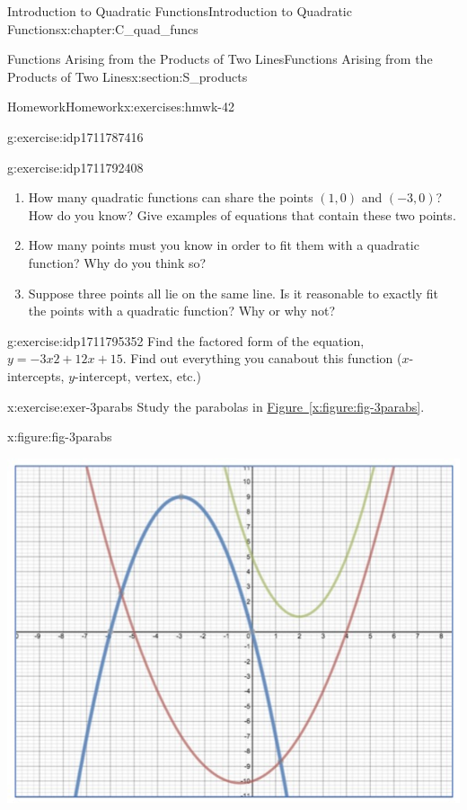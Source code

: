 \documentclass[oneside,10pt,]{book}
\newcommand{\xreffont}{\relax}
\numberwithin{equation}{chapter}
\begin{document}
\begin{chapterptx}{Introduction to Quadratic Functions}{}{Introduction to Quadratic Functions}{}{}{x:chapter:C_quad_funcs}
\begin{sectionptx}{Functions Arising from the Products of Two Lines}{}{Functions Arising from the Products of Two Lines}{}{}{x:section:S_products}
\begin{exercises-subsection}{Homework}{}{Homework}{}{}{x:exercises:hmwk-42}
\begin{divisionexercise}{5}{}{}{g:exercise:idp1711787416}
\begin{enumerate}[font=\bfseries,label=(\alph*),ref=\alph*]
\end{enumerate}
\end{divisionexercise}%
\begin{divisionexercise}{6}{}{}{g:exercise:idp1711792408}%
\begin{enumerate}[font=\bfseries,label=(\alph*),ref=\alph*]
\item{}How many quadratic functions can share the points \((1, 0)\) and \((-3, 0)\)? How do you know? Give examples of equations that contain these two points.%
\item{}How many points must you know in order to fit them with a quadratic function? Why do you think so?%
\item{}Suppose three points all lie on the same line. Is it reasonable to exactly fit the points with a quadratic function? Why or why not?%
\end{enumerate}
\end{divisionexercise}%
\begin{divisionexercise}{7}{}{}{g:exercise:idp1711795352}%
Find the factored form of the equation, \(y = -3x2 + 12x + 15\). Find out everything you canabout this function (\(x\)-intercepts, \(y\)-intercept, vertex, etc.)%
\end{divisionexercise}%
\begin{divisionexercise}{8}{}{}{x:exercise:exer-3parabs}%
Study the parabolas in \hyperref[x:figure:fig-3parabs]{Figure~{\xreffont\ref{x:figure:fig-3parabs}}}.%
\begin{figureptx}{}{x:figure:fig-3parabs}{}%
\begin{image}{0.15}{0.7}{0.15}%
\includegraphics[width=\linewidth]{external/3parabs.pdf}

\end{image}
\end{figureptx}
\end{divisionexercise}
\end{exercises-subsection}
\end{sectionptx}
\end{chapterptx}
\end{document}
